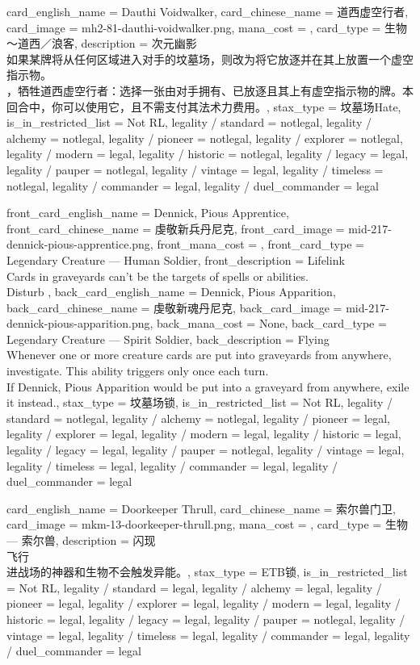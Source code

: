 \documentclass[lang = cn, color = black, 10pt]{AllThatStax}
\begin{document}
\card
{
	card_english_name = {Dauthi Voidwalker},
	card_chinese_name = {道西虚空行者},
	card_image = mh2-81-dauthi-voidwalker.png,
	mana_cost = ,
	card_type = 生物 ～道西／浪客,
	description = {次元幽影\\
		如果某牌将从任何区域进入对手的坟墓场，则改为将它放逐并在其上放置一个虚空指示物。\\
		，牺牲道西虚空行者：选择一张由对手拥有、已放逐且其上有虚空指示物的牌。本回合中，你可以使用它，且不需支付其法术力费用。},
	stax_type = 坟墓场Hate,
	is_in_restricted_list = Not RL,
	legality / standard = notlegal,
	legality / alchemy = notlegal,
	legality / pioneer = notlegal,
	legality / explorer = notlegal,
	legality / modern = legal,
	legality / historic = notlegal,
	legality / legacy = legal,
	legality / pauper = notlegal,
	legality / vintage = legal,
	legality / timeless = notlegal,
	legality / commander = legal,
	legality / duel_commander = legal
}

\mfcard
{
	front_card_english_name = {Dennick, Pious Apprentice},
	front_card_chinese_name = {虔敬新兵丹尼克},
	front_card_image = mid-217-dennick-pious-apprentice.png,
	front_mana_cost = ,
	front_card_type = Legendary Creature — Human Soldier,
	front_description = {Lifelink\\
		Cards in graveyards can't be the targets of spells or abilities.\\
		Disturb  },
	back_card_english_name = {Dennick, Pious Apparition},
	back_card_chinese_name = {虔敬新魂丹尼克},
	back_card_image = mid-217-dennick-pious-apparition.png,
	back_mana_cost = None,
	back_card_type = Legendary Creature — Spirit Soldier,
	back_description = {Flying\\
		Whenever one or more creature cards are put into graveyards from anywhere, investigate. This ability triggers only once each turn. \\
		If Dennick, Pious Apparition would be put into a graveyard from anywhere, exile it instead.},
	stax_type = 坟墓场锁,
	is_in_restricted_list = Not RL,
	legality / standard = notlegal,
	legality / alchemy = notlegal,
	legality / pioneer = legal,
	legality / explorer = legal,
	legality / modern = legal,
	legality / historic = legal,
	legality / legacy = legal,
	legality / pauper = notlegal,
	legality / vintage = legal,
	legality / timeless = legal,
	legality / commander = legal,
	legality / duel_commander = legal
}

\card
{
	card_english_name = {Doorkeeper Thrull},
	card_chinese_name = {索尔兽门卫},
	card_image = mkm-13-doorkeeper-thrull.png,
	mana_cost = ,
	card_type = 生物 — 索尔兽,
	description = {闪现\\
		飞行\\
		进战场的神器和生物不会触发异能。},
	stax_type = ETB锁,
	is_in_restricted_list = Not RL,
	legality / standard = legal,
	legality / alchemy = legal,
	legality / pioneer = legal,
	legality / explorer = legal,
	legality / modern = legal,
	legality / historic = legal,
	legality / legacy = legal,
	legality / pauper = notlegal,
	legality / vintage = legal,
	legality / timeless = legal,
	legality / commander = legal,
	legality / duel_commander = legal
}
\end{document}
